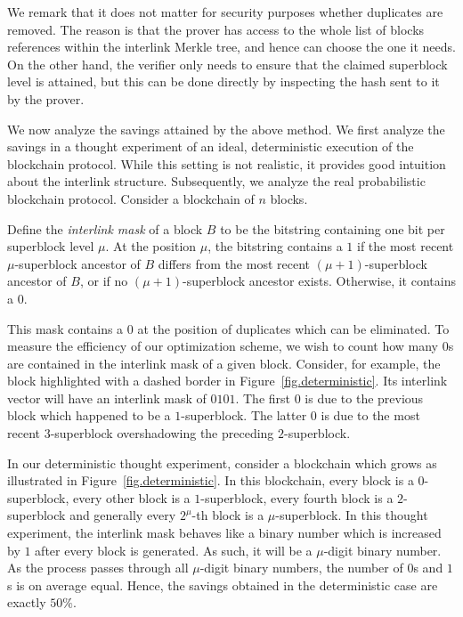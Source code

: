 We remark that it does not matter for security purposes whether duplicates are
removed. The reason is that the prover has access to the whole list of blocks
references within the interlink Merkle tree, and hence can choose the one it
needs. On the other hand, the verifier only needs to ensure that the claimed
superblock level is attained, but this can be done directly by inspecting the
hash sent to it by the prover.

We now analyze the savings attained by the above method. We first analyze the
savings in a thought experiment of an ideal, deterministic execution of the
blockchain protocol. While this setting is not realistic, it provides good
intuition about the interlink structure. Subsequently, we analyze the real
probabilistic blockchain protocol. Consider a blockchain of $n$ blocks.

\begin{definition}
Define the \emph{interlink mask} of a block $B$ to be the bitstring containing
one bit per superblock level $\mu$. At the position $\mu$, the bitstring contains
a $1$ if the most recent $\mu$-superblock ancestor of $B$ differs from the most
recent $(\mu+1)$-superblock ancestor of $B$, or if no $(\mu+1)$-superblock
ancestor exists. Otherwise, it contains a $0$.
\end{definition}

This mask contains a $0$ at the position of duplicates which can be eliminated.
To measure the efficiency of our optimization scheme, we wish to count how many
$0$s are contained in the interlink mask of a given block. Consider, for
example, the block highlighted with a dashed border in
Figure~\ref{fig.deterministic}. Its interlink vector will have an interlink mask
of $0101$. The first $0$ is due to the previous block which happened to be a
$1$-superblock. The latter $0$ is due to the most recent $3$-superblock
overshadowing the preceding $2$-superblock.

In our deterministic thought experiment, consider a blockchain which grows as
illustrated in Figure~\ref{fig.deterministic}. In this blockchain, every block
is a $0$-superblock, every other block is a $1$-superblock, every fourth block
is a $2$-superblock and generally every $2^\mu$-th block is a
$\mu$-superblock.
In this thought experiment, the interlink mask behaves like a binary number
which is increased by $1$ after every block is generated. As such, it will be a
$\mu$-digit binary number. As the process passes through all $\mu$-digit binary
numbers, the number of $0$s and $1$s is on average equal. Hence, the savings
obtained in the deterministic case are exactly $50\%$.

